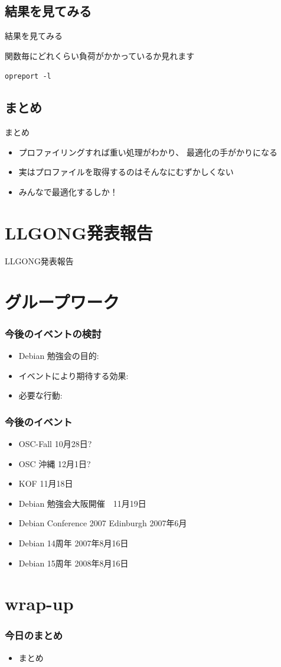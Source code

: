 \documentclass[cjk,dvipdfmx]{beamer}
\begin{document}
\subsection{結果を見てみる}
\begin{frame}{結果を見てみる}

関数毎にどれくらい負荷がかかっているか見れます

\texttt{opreport -l }

\end{frame}

\subsection{まとめ}
\begin{frame}{まとめ}
\begin{itemize}
 \item プロファイリングすれば重い処理がわかり、
       最適化の手がかりになる
 \item 実はプロファイルを取得するのはそんなにむずかしくない
 \item みんなで最適化するしか！
\end{itemize}
\end{frame}


\section{LLGONG発表報告}
\begin{frame}{LLGONG発表報告}

\end{frame}

\section{グループワーク}

\begin{frame}
 \frametitle{今後のイベントの検討}
 \begin{itemize}
  \item Debian 勉強会の目的:
  \item イベントにより期待する効果:
  \item 必要な行動:
 \end{itemize}
\end{frame}

\begin{frame}
 \frametitle{今後のイベント}
 \begin{itemize}
  \item OSC-Fall 10月28日? 
  \item OSC 沖縄 12月1日?
  \item KOF 11月18日
  \item Debian 勉強会大阪開催　11月19日
  \item Debian Conference 2007 Edinburgh 2007年6月
  \item Debian 14周年 2007年8月16日
  \item Debian 15周年 2008年8月16日
 \end{itemize}
\end{frame}

\section{wrap-up}
\begin{frame}
 \frametitle{今日のまとめ}
 \begin{itemize}
  \item まとめ
 \end{itemize}
\end{frame}
\end{document}
